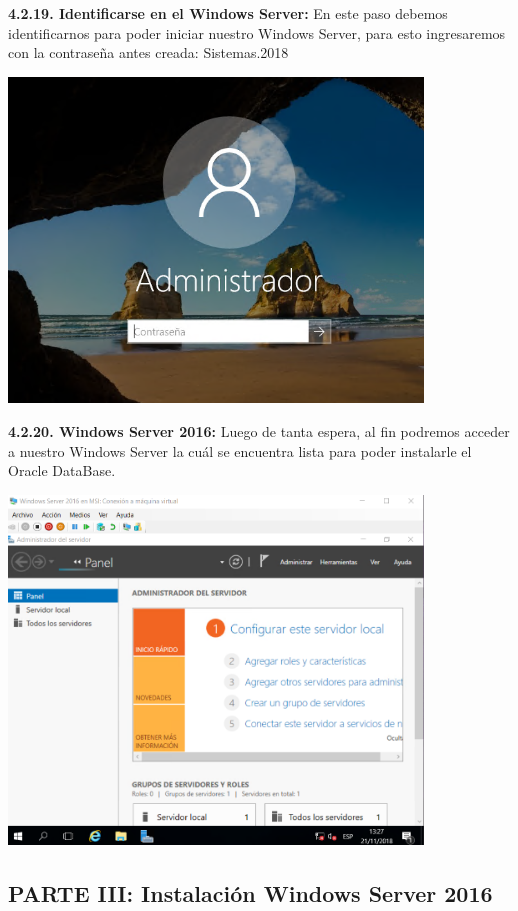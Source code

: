 \textbf {4.2.19. Identificarse en el Windows Server:} En este paso debemos identificarnos para poder iniciar nuestro Windows Server, para esto ingresaremos con la contraseña antes creada: Sistemas.2018
\begin{center}
  \includegraphics[width=11cm]{Imagenes/Identificarse.png}
\end{center}

\textbf {4.2.20. Windows Server 2016:} Luego de tanta espera, al fin podremos acceder a nuestro Windows Server la cuál se encuentra lista para poder instalarle el Oracle DataBase.
\begin{center}
  \includegraphics[width=11cm]{Imagenes/Escritorio_Windows_Server.png}
\end{center}
\break

\subsection{PARTE III: Instalación Windows Server 2016}

